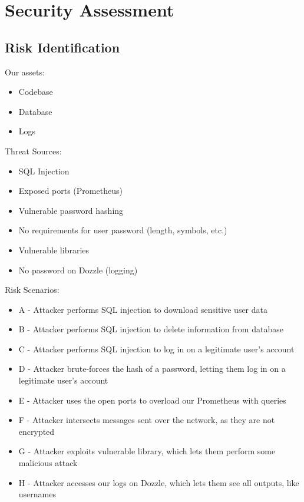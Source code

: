 \section{Security Assessment}
\subsection{Risk Identification}
Our assets:
\begin{itemize}
    \item Codebase
    \item Database
    \item Logs
\end{itemize}

Threat Sources:
\begin{itemize}
    \item SQL Injection
    \item Exposed ports (Prometheus)
    \item Vulnerable password hashing
    \item No requirements for user password (length, symbols, etc.)
    \item Vulnerable libraries
    \item No password on Dozzle (logging)
\end{itemize}

Risk Scenarios:
\begin{itemize}
    \item A - Attacker performs SQL injection to download sensitive user data
    \item B - Attacker performs SQL injection to delete information from database
    \item C - Attacker performs SQL injection to log in on a legitimate user's account
    \item D - Attacker brute-forces the hash of a password, letting them log in on a legitimate user's account
    \item E - Attacker uses the open ports to overload our Prometheus with queries
    \item F - Attacker intersects messages sent over the network, as they are not encrypted
    \item G - Attacker exploits vulnerable library, which lets them perform some malicious attack
    \item H - Attacker accesses our logs on Dozzle, which lets them see all outputs, like usernames
\end{itemize}

